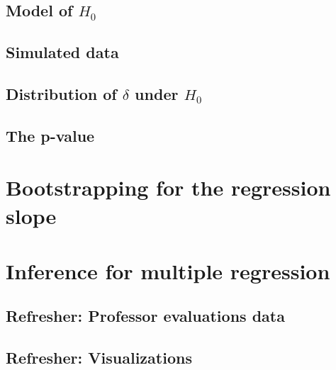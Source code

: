 \documentclass[
  12pt, krantz2,
]{krantz}
\begin{document}
\hypertarget{model-of-h_0-1}{%
\subsection{\texorpdfstring{Model of \(H_0\)}{Model of H\_0}}\label{model-of-h_0-1}}

\hypertarget{simulated-data-1}{%
\subsection{Simulated data}\label{simulated-data-1}}

\hypertarget{distribution-of-delta-under-h_0-1}{%
\subsection{\texorpdfstring{Distribution of \(\delta\) under \(H_0\)}{Distribution of \textbackslash delta under H\_0}}\label{distribution-of-delta-under-h_0-1}}

\hypertarget{the-p-value-1}{%
\subsection{The p-value}\label{the-p-value-1}}

\hypertarget{bootstrapping-for-the-regression-slope}{%
\section{Bootstrapping for the regression slope}\label{bootstrapping-for-the-regression-slope}}

\hypertarget{inference-for-multiple-regression}{%
\section{Inference for multiple regression}\label{inference-for-multiple-regression}}

\hypertarget{refresher-professor-evaluations-data}{%
\subsection{Refresher: Professor evaluations data}\label{refresher-professor-evaluations-data}}

\hypertarget{refresher-visualizations}{%
\subsection{Refresher: Visualizations}\label{refresher-visualizations}}
\end{document}
